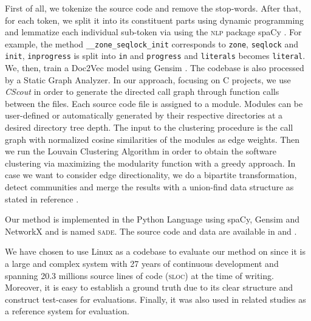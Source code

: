 \documentclass[sigconf, screen]{acmart}
\begin{document}
First of all, we tokenize the source code and remove the stop-words. 
After that, for each token, we split it into its constituent parts using dynamic programming \cite{wordninja} and lemmatize 
each individual sub-token via using the \textsc{nlp} package spaCy \cite{spacy}. 
For example, the method \texttt{\_\_zone\_seqlock\_init} corresponds to \texttt{zone}, \texttt{seqlock} and \texttt{init}, 
\texttt{inprogress} is split into \texttt{in} and \texttt{progress} and \texttt{literals} becomes \texttt{literal}.
We, then, train a Doc2Vec model using Gensim \cite{gensim}. 
The codebase is also processed by a Static Graph Analyzer. 
In our approach, focusing on C projects, we use \emph{CScout} \cite{cscout} in order to generate the directed call graph through function calls between the files. 
Each source code file is assigned to a module. 
Modules can be user-defined or automatically generated by their respective directories at a desired directory tree depth. 
The input to the clustering procedure
is the call graph with normalized cosine similarities of the modules as edge weights.
Then we run the Louvain Clustering Algorithm \cite{louvain} in
order to obtain the software clustering via maximizing the modularity function with a greedy approach. 
In case we want to consider edge directionality, we do a bipartite transformation, detect communities and
merge the results with a union-find data structure as stated in reference \cite{malliaros}.

Our method is implemented in the Python Language using spaCy\cite{spacy}, Gensim \cite{gensim} and NetworkX \cite{nx} and is named \textsc{sade}. The source code and data are available in \cite{source_code} and \cite{call_graph}. 


We have chosen to use Linux as a codebase to evaluate our method on since it is a large and complex system with 27 years of continuous development and spanning 20.3 millions source lines of code (\textsc{sloc}) at the time of writing.  
Moreover, it is easy to establish a ground truth due to its clear
structure and construct test-cases for
evaluations. 
Finally, it was also used in related studies \cite{acdc, evaluation} as a reference system for evaluation.  
\end{document}
